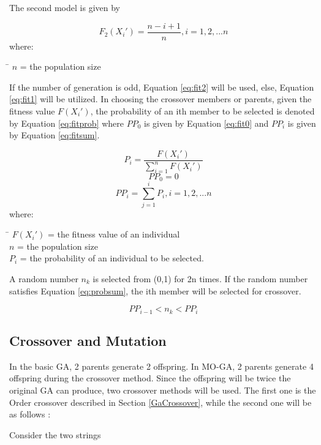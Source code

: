 The second model is given by \par 
\begin{equation}
	\label{eq:fit2}
	F_2(X_i')= \frac{n-i+1}{n}  , i=1, 2 ,... n
\end{equation}
where:
\begin{tabbing}
	\= \kill
	$n$\> = the population size\\
\end{tabbing}

\hfill \par 

If the number of generation is odd, Equation \ref{eq:fit2} will be used, else, Equation \ref{eq:fit1} will be utilized. In choosing the crossover members or parents, given the fitness value $F(X_i')$, the probability of an ith member to be selected is denoted by Equation \ref{eq:fitprob} where $PP_0$ is given by Equation \ref{eq:fit0} and $PP_i$ is given by Equation \ref{eq:fitsum}. \par 

\begin{equation}
	\label{eq:fitprob}
	P_i = \frac{F(X_i')}{\sum_{i=1}^{n} F(X_i')}
\end{equation}
\begin{equation}
	\label{eq:fit0}
	PP_0=0
\end{equation}
\begin{equation}
	\label{eq:fitsum}
	PP_i= \sum_{j=1}^i  P_i  , i=1, 2, ... n 
\end{equation}
where:
\begin{tabbing}
	\= \kill
	$F(X_i')$ = the fitness value of an individual\\
	$n$\> = the population size\\
	$P_i$ \> = the probability of an individual to be selected.\\
\end{tabbing}


A random number $n_k$ is selected from (0,1) for 2n times. If the random number satisfies Equation \ref{eq:probsum}, the ith member will be selected for crossover.

\begin{equation}
	\label{eq:probsum}
	PP_{i-1} < n_k < PP_i
\end{equation}


\subsection{Crossover and Mutation}
\label{MogaCrossover}
\indent \indent In the basic GA, 2 parents generate 2 offspring. In MO-GA, 2 parents generate 4 offspring during the crossover method.
Since the offspring will be twice the original GA can produce, two crossover methods will be used. The first one is the Order crossover described in Section \ref{GaCrossover}, while the second one will be as follows : \par 
Consider the two strings \par 

